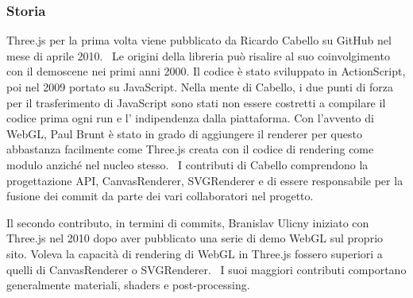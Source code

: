 
\subsubsection{Storia}
Three.js per la prima volta viene pubblicato da Ricardo Cabello su GitHub nel mese di aprile 2010.~\cite{Firstcommit}
Le origini della libreria pu\`o risalire al suo coinvolgimento con il demoscene nei primi anni 2000.
Il codice \`e stato sviluppato in ActionScript, poi nel 2009 portato su JavaScript. Nella mente di Cabello,
i due punti di forza per il trasferimento di JavaScript sono stati non essere costretti a compilare il codice prima
ogni run e l' indipendenza dalla piattaforma. Con l'avvento di WebGL, Paul Brunt è stato in grado di aggiungere il renderer
per questo abbastanza facilmente come Three.js creata con il codice di rendering come modulo anziché nel
nucleo stesso.~\cite{develop} I contributi di Cabello comprendono la progettazione API, CanvasRenderer, SVGRenderer e di essere
responsabile per la fusione dei commit da parte dei vari collaboratori nel progetto.


Il secondo contributo, in termini di commits, Branislav Ulicny iniziato con Three.js nel 2010 dopo aver
pubblicato una serie di demo WebGL sul proprio sito. Voleva la capacit\`a di rendering di WebGL in Three.js
fossero superiori a quelli di CanvasRenderer o SVGRenderer.~\cite{develop}
I suoi maggiori contributi comportano generalmente materiali, shaders e post-processing.

